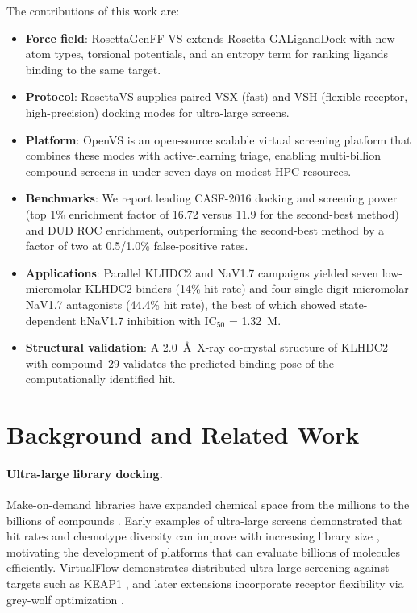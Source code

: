 \documentclass[10pt]{article}
\begin{document}
The contributions of this work are:
\begin{itemize}
  \item \textbf{Force field}: RosettaGenFF-VS extends Rosetta GALigandDock
  \citep{leman2020rosetta} with new atom types, torsional potentials, and an
  entropy term for ranking ligands binding to the same target.
  \item \textbf{Protocol}: RosettaVS supplies paired VSX (fast) and VSH
  (flexible-receptor, high-precision) docking modes for ultra-large screens.
  \item \textbf{Platform}: OpenVS is an open-source scalable virtual
  screening platform that combines these modes with active-learning triage,
  enabling multi-billion compound screens in under seven days on modest HPC
  resources.
  \item \textbf{Benchmarks}: We report leading CASF-2016 docking and
  screening power (top 1\% enrichment factor of 16.72 versus 11.9 for the
  second-best method) and DUD ROC enrichment, outperforming the second-best
  method by a factor of two at 0.5/1.0\% false-positive rates.
  \item \textbf{Applications}: Parallel KLHDC2 and NaV1.7 campaigns yielded
  seven low-micromolar KLHDC2 binders (14\% hit rate) and four
  single-digit-micromolar NaV1.7 antagonists (44.4\% hit rate), the best of
  which showed state-dependent hNaV1.7 inhibition with IC$_{50}$ = 1.32~\textmu M.
  \item \textbf{Structural validation}: A 2.0~\AA\ X-ray co-crystal structure
  of KLHDC2 with compound~29 validates the predicted binding pose of the
  computationally identified hit.
\end{itemize}

\section{Background and Related Work}

\paragraph{Ultra-large library docking.}
Make-on-demand libraries have expanded chemical space from the millions to
the billions of compounds \citep{lyu2019ultralarge,tingle2023zinc22}. Early
examples of ultra-large screens demonstrated that hit rates and chemotype
diversity can improve with increasing library size
\citep{lyu2019ultralarge,gorgulla2020virtualflow}, motivating the development
of platforms that can evaluate billions of molecules efficiently.
VirtualFlow demonstrates distributed ultra-large screening against targets
such as KEAP1 \citep{gorgulla2020virtualflow}, and later extensions
incorporate receptor flexibility via grey-wolf optimization
\citep{gorgulla2020virtualflowgwo}.
\end{document}
